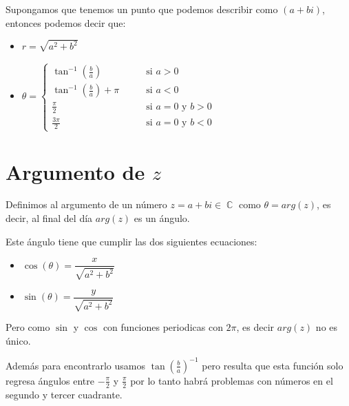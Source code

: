 \documentclass[12pt, fleqn]{report}                             %
\DeclareMathOperator \Space {\quad}                             %
\newcommand{\Wrap}[1]{\left( #1 \right)}                        %
\DeclareMathOperator \Complexs  {\mathbb{C}}                     %
\newcommand{\Cos}[1]{\cos\Wrap{#1}}                             %
\newcommand{\Sin}[1]{\sin\Wrap{#1}}                             %
\begin{document}
                Supongamos que tenemos un punto que podemos describir como $(a+bi)$,
                entonces podemos decir que:

                \begin{itemize}
                    \item $r = \sqrt{a^2+b^2}$
                    \item $\theta = \begin{cases}
                                        \tan^{-1}(\frac{b}{a})          \Space &\text{ si } a > 0                  \\
                                        \tan^{-1}(\frac{b}{a})+\pi      \Space &\text{ si } a < 0                  \\
                                        \frac{\pi}{2}                   \Space &\text{ si } a = 0 \text{ y } b > 0 \\
                                        \frac{3\pi}{2}                  \Space &\text{ si } a = 0 \text{ y } b < 0 
                                    \end{cases}$
                \end{itemize}

        \clearpage
        \section{Argumento de $z$}
            
            Definimos al argumento de un número $z = a+bi \in \Complexs$ como $\theta = arg(z)$,
            es decir, al final del día $arg(z)$ es un ángulo.

            Este ángulo tiene que cumplir las dos siguientes ecuaciones:

            \begin{itemize}
                \item $\Cos{\theta} = \dfrac{x}{\sqrt{a^2+b^2}}$
                \item $\Sin{\theta}   = \dfrac{y}{\sqrt{a^2+b^2}}$
            \end{itemize}

            Pero como $\sin$ y $\cos$ con funciones periodicas con $2\pi$, es decir $arg(z)$ no es único.

            Además para encontrarlo usamos $\tan(\frac{b}{a})^{-1}$ pero resulta que esta función solo
            regresa ángulos entre $-\frac{\pi}{2}$ y $\frac{\pi}{2}$ por lo tanto habrá problemas con
            números en el segundo y tercer cuadrante.
\end{document}
